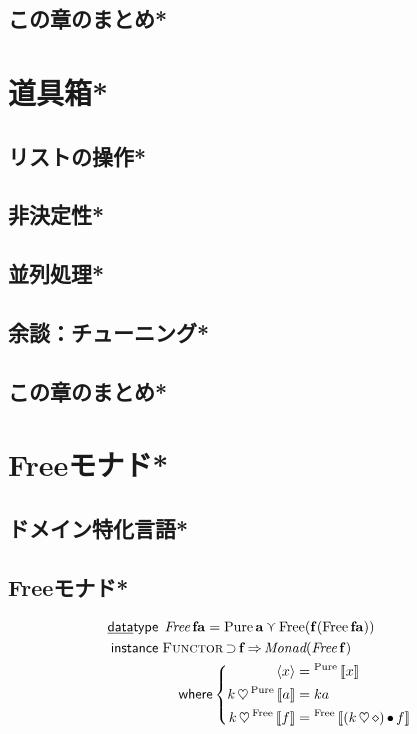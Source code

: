 \documentclass[a4paper,twocolumn]{jsbook}
\def\[{\left[\!\left[}
\def\]{\right]\!\right]}
\newcommand{\mKeyword}[1]{\mathsf{#1}} %
\newcommand{\mKeywordUnderline}[1]{\text{\underline{\textsf{#1}}}} %
\newcommand{\mDataTypeKeyword}{\mKeywordUnderline{data}\mKeyword{type}}
\newcommand{\mInstanceKeyword}{\mKeyword{instance}}
\newcommand{\mWhereKeyword}{\mKeyword{where}}
\DeclareMathOperator{\mDataType}{\mDataTypeKeyword}
\DeclareMathOperator{\mInstance}{\mInstanceKeyword}
\DeclareMathOperator{\mSuperClass}{\Rightarrow}
\DeclareMathOperator{\mSuperSet}{\supset}
\DeclareMathOperator{\mWhere}{\mWhereKeyword}
\newcommand{\mAnonParam}{\diamond}
\DeclareMathOperator{\mBind}{\heartsuit}
\DeclareMathOperator{\mMap}{\bullet}
\DeclareMathOperator{\mValueOr}{\curlyvee}
\newcommand{\mType}[1]{\mathbf{#1}}
\newcommand{\mTypeConstructor}[1]{\textit{#1}}
\newcommand{\mGenericValueConstructor}[1]{\mathrm{#1}}
\newcommand{\mGenericWith}[2]{{}^\mGenericValueConstructor{#1}\[#2\]}
\newcommand{\mPureWith}[1]{\langle#1\rangle}
\newcommand{\mGenericTypeClass}[1]{\textsc{#1}} %
\newcommand{\mFunctorTypeClass}{\mGenericTypeClass{Functor}}
\begin{document}
\section{この章のまとめ*}



\chapter{道具箱*}
\section{リストの操作*}
\section{非決定性*}
\section{並列処理*}
\section{余談：チューニング*}
\section{この章のまとめ*}




\chapter{Freeモナド*}
\section{ドメイン特化言語*}
\section{Freeモナド*}
\begin{align}
\mDataType\;&\mathop{\mTypeConstructor{Free}}\mType{f}\mType{a}=\mathop{\mGenericValueConstructor{Pure}}\mType{a}\mValueOr\mathop{\mGenericValueConstructor{Free}(\mType{f}(\mathop{\mGenericValueConstructor{Free}}\mType{f}\mType{a}))}\\
\mInstance\;&\mFunctorTypeClass\mSuperSet\mType{f}\mSuperClass\mTypeConstructor{Monad}(\mathop{\mTypeConstructor{Free}}\mType{f})\nonumber\\
&\quad\mWhere\left\{
\begin{aligned}
\mPureWith{x}&=\mGenericWith{Pure}{x}\\
k\mBind\mGenericWith{Pure}{a}&=ka\\
k\mBind\mGenericWith{Free}{f}&=\mGenericWith{Free}{(k\mBind\mAnonParam)\mMap f}
\end{aligned}
\right.
\end{align}
\end{document}
